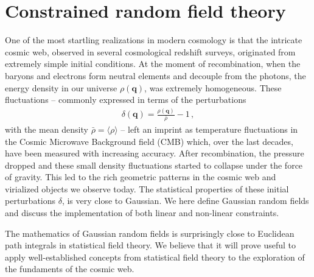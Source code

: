 \documentclass[a4paper, 11pt]{article}
\begin{document}
\section{Constrained random field theory}\label{sec:GRF}
One of the most startling realizations in modern cosmology is that the intricate cosmic web, observed in several cosmological redshift surveys, originated from extremely simple initial conditions. At the moment of recombination, when the baryons and electrons form neutral elements and decouple from the photons, the energy density in our universe $\rho(\bm{q})$, was extremely homogeneous. These fluctuations -- commonly expressed in terms of the perturbations
\begin{align}
\delta(\bm{q}) = \frac{\rho(\bm{q})}{\bar{\rho}} -1\,,
\end{align}
with the mean density $\bar{\rho} = \langle \rho \rangle$ -- left an imprint as temperature fluctuations in the Cosmic Microwave Background field (CMB) which, over the last decades, have been measured with increasing accuracy. After recombination, the pressure dropped and these small density fluctuations started to collapse under the force of gravity. This led to the rich geometric patterns in the cosmic web and virialized objects we observe today. The statistical properties of these initial perturbations $\delta$, is very close to Gaussian. We here define Gaussian random fields and discuss the implementation of both linear and non-linear constraints.

\begin{framed}
The mathematics of Gaussian random fields is surprisingly close to Euclidean path integrals in statistical field theory. We believe that it will prove useful to apply well-established concepts from statistical field theory to the exploration of the fundaments of the cosmic web.
\end{framed}

\end{document}
